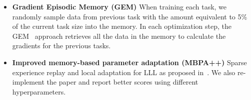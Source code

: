 \documentclass{article} %
\begin{document}
\begin{itemize}[leftmargin=*]
    \item \textbf{Gradient Episodic Memory (GEM)} When training each task, we randomly sample data from previous task with the amount equivalent to 5\% of the current task size into the memory. In each optimization step, the GEM~\citep{lopez2017gradient} approach retrieves all the data in the memory to calculate the gradients for the previous tasks.

    \item \textbf{Improved memory-based parameter adaptation (MBPA++)} Sparse experience replay and local adaptation for LLL as proposed in~\citet{d2019episodic}. We also re-implement the paper and report better scores using different hyperparameters.

\end{itemize}





\end{document}
